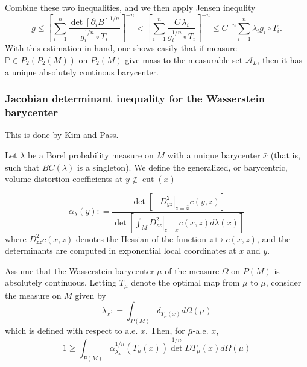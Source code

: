 Combine these two inequalities, and we then apply Jensen inequlity
\[
	\bar{g} \leq
	\left[ \sum_{i=1}^n \frac{\det[\partial_i B]^{1/n}}
	{g_i^{1/n} \circ T_i}\right]^{-n}
	< \left[ \sum_{i=1}^n \frac{C \, \lambda_i}
	{g_i^{1/n} \circ T_i}\right]^{-n}
	\leq C^{-n} \sum_{i=1}^n \lambda_i g_i \circ T_i.
\]
With this estimation in hand,
one shows easily that if measure $\mathbb{P} \in P_2(P_2(M))$ on $P_2(M)$ give mass to the measurable set $\mathcal{A}_L$,
then it has a unique absolutely continous barycenter.

\subsubsection{Jacobian determinant inequality for the Wasserstein barycenter}

This is done by Kim and Pass.
\begin{defn}
	Let \( \lambda \) be a Borel probability measure on \( M \) with a
	unique barycenter \( \bar { x } \) (that is, such that \( B C ( \lambda ) \) is a singleton). We define the generalized,
	or barycentric, volume distortion coefficients at \( y \notin \operatorname { cut } ( \bar { x } ) \)

	\[ \alpha _ { \lambda } ( y ) : = \frac { \operatorname { det } \left[ - \left. D _ { y z } ^ { 2 } \right| _ { z = \bar { x } } c ( y , z ) \right] } { \operatorname { det } \left[ \left. \int _ { M } D _ { z z } ^ { 2 } \right| _ { z = \bar { x } } c ( x , z ) d \lambda ( x ) \right] } \]
	where \( D _ { z z } ^ { 2 } c ( x , z ) \) denotes the Hessian of the function \( z \mapsto c ( x , z ) \), and the determinants
	are computed in exponential local coordinates at \( \bar { x } \) and \( y . \)
\end{defn}

\begin{thm}
	Assume that the Wasserstein barycenter \( \bar { \mu } \) of the measure \( \Omega \) on \( P ( M ) \) is absolutely continuous.
	Letting \( T _ { \mu } \) denote the optimal map from \( \bar { \mu } \) to \( \mu \), consider the measure on \( M \) given by
	\[ \lambda _ { x } : = \int _ { P ( M ) } \delta _ { T _ { \mu } ( x ) } d \Omega ( \mu ) \]
	which is defined with respect to a.e. $x$.
	Then, for \( \bar { \mu } \)-a.e. \(x\),
	\[ 1 \geq \int _ { P ( M ) } \alpha _ { \lambda _ { x } } ^ { 1 / n } \left( T _ { \mu } ( x ) \right) \operatorname { det } ^ { 1 / n } D T _ { \mu } ( x ) d \Omega ( \mu ) \]
\end{thm}


